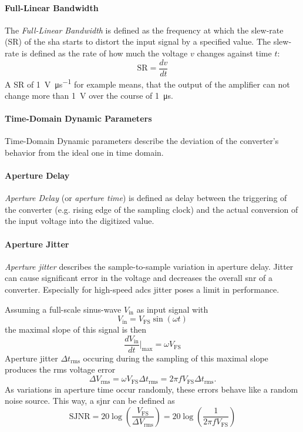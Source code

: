 \paragraph{Full-Linear Bandwidth}
The \textit{Full-Linear Bandwidth} is defined as the frequency at which the slew-rate (SR) of the \gls{sha} starts to distort the input signal by a specified value. \cite{Lundberg} The slew-rate is defined as the rate of how much the voltage $v$ changes against time $t$:
\begin{equation}
	\text{SR} = \frac{dv}{dt}
\end{equation}
A SR of \SI{1}{\volt \per \micro \second} for example means, that the output of the amplifier can not change more than \SI{1}{\volt} over the course of \SI{1}{\micro \second}.\cite{2021Slew} 

\paragraph{Time-Domain Dynamic Parameters}
Time-Domain Dynamic parameters describe the deviation of the converter's behavior from the ideal one in time domain. 

\paragraph{Aperture Delay}
\textit{Aperture Delay} (or \textit{aperture time}) is defined as delay between the triggering of the converter (e.g. rising edge of the sampling clock) and the actual conversion of the input voltage into the digitized value. \cite{Lundberg}

\paragraph{Aperture Jitter}
\textit{Aperture jitter} describes the sample-to-sample variation in aperture delay. Jitter can cause significant error in the voltage and decreases the overall \gls{snr} of a converter. Especially for high-speed \glspl{adc} jitter poses a limit in performance.

Assuming a full-scale sinus-wave $V_{\text{in}}$ as input signal with 
\begin{equation}
	V_{\text{in}} = V_{\text{FS}} \sin (\omega t)
\end{equation}
the maximal slope of this signal is then
\begin{equation}
	\frac{dV_{\text{in}}}{dt}\Bigr|_{\text{max}} = \omega V_{\text{FS}}
\end{equation}
Aperture jitter $\Delta t_{\text{rms}}$ occuring during the sampling of this maximal slope produces the \gls{rms} voltage error 
\begin{equation}
	\Delta V_{\text{rms}} = \omega  V_{\text{FS}} \Delta t_{\text{rms}} = 2 \pi f  V_{\text{FS}} \Delta t_{\text{rms}}.
\end{equation}
As variations in aperture time occur randomly, these errors behave like a random noise source. This way, a \gls{sjnr} can be defined as
\begin{equation}
	\text{SJNR} = 20 \log \left( \frac{V_{\text{FS}}}{\Delta V_{\text{rms}}} \right) = 20 \log \left( \frac{1}{2 \pi f  V_{\text{FS}}} \right)
\end{equation}

